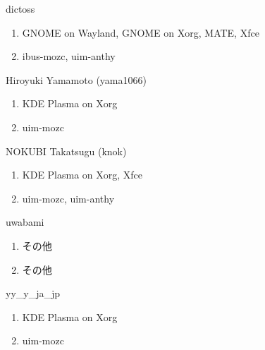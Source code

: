\begin{prework}{ dictoss }
  \begin{enumerate}
  \item GNOME on Wayland, GNOME on Xorg, MATE, Xfce
  \item ibus-mozc, uim-anthy
  \end{enumerate}
\end{prework}

\begin{prework}{ Hiroyuki Yamamoto (yama1066) }
  \begin{enumerate}
  \item KDE Plasma on Xorg
  \item uim-mozc
  \end{enumerate}
\end{prework}

\begin{prework}{ NOKUBI Takatsugu (knok) }
  \begin{enumerate}
  \item KDE Plasma on Xorg, Xfce
  \item uim-mozc, uim-anthy
  \end{enumerate}
\end{prework}

\begin{prework}{ uwabami }
  \begin{enumerate}
  \item その他
  \item その他
  \end{enumerate}
\end{prework}

\begin{prework}{ yy\_y\_ja\_jp }
  \begin{enumerate}
  \item KDE Plasma on Xorg
  \item uim-mozc
  \end{enumerate}
\end{prework}
